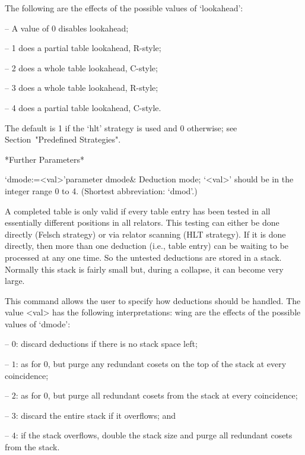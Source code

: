 The following are the effects of the possible values of `lookahead':

\beginlist

\item{--} A value of 0 disables lookahead;
\item{--} 1 does a partial table lookahead, R-style; 
\item{--} 2 does a whole table lookahead, C-style; 
\item{--} 3 does a whole table lookahead, R-style; 
\item{--} 4 does a partial table lookahead, C-style.  

\endlist

The  default  is  1 if the `hlt' strategy is used and 0 otherwise;
see Section~"Predefined Strategies".

*Further Parameters*

\>`dmode:=<val>'{parameter dmode}&
Deduction mode; `<val>' should be in the integer range 0 to 4.
(Shortest abbreviation: `dmod'.)

A completed table  is only valid if every table  entry has been tested
in all essentially different  positions in all relators.  This testing
can either be done directly  (Felsch strategy) or via relator scanning
(HLT strategy).  If it is  done directly, then more than one deduction
(i.e., table  entry) can be waiting  to be processed at  any one time.
So the untested deductions are stored in a stack.  Normally this stack
is fairly small but, during a collapse, it can become very large.

This  command allows  the user  to  specify how  deductions should  be
handled.  The value <val> has the following interpretations:
wing are the effects of the possible values of `dmode':

\beginlist

\item{--} $0$:  
discard deductions if there is no stack space left;

\item{--} $1$: 
as for $0$, but purge any redundant cosets on the top of the stack
at every coincidence;

\item{--} $2$: 
as for 0, but  purge all redundant cosets from the stack at
every coincidence;

\item{--} $3$:
discard the entire stack if it overflows; and

\item{--} $4$:
if  the stack  overflows,  double the  stack size  and  purge all
redundant cosets from the stack.

